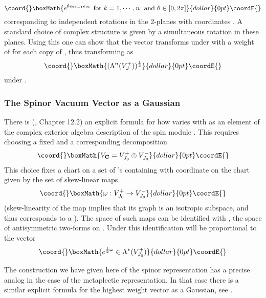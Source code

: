 \documentclass[a4paper,a4paper]{article}
\theoremstyle{conjecture}
\begin{document}
$$\coord{}\boxMath{ e^{\theta e_{2k-1}e_{2k}} \ \text{for} \ k=1,\cdots,n\ \ \text{and} \ \theta\in [0,2\pi]}{dollar}{0pt}\coordE{}$$
corresponding to independent rotations in the \coordHE{} 2-planes with coordinates \coordHE{}.
A standard choice of complex structure \coordHE{} is given by a simultaneous \coordHE{} rotation
in these planes. Using this one can show that the vector \coordHE{} transforms under \coordHE{}
with a weight of \coordHE{} for each copy of \coordHE{}, thus transforming as
$$\coord{}\boxMath{(\Lambda^{n}(V^+_J))^{\frac{1}{2}}}{dollar}{0pt}\coordE{}$$
under \coordHE{}.

\subsubsection{The Spinor Vacuum Vector as a Gaussian}
\label{spinor-vacuum-vector}

There is (\cite{PS}, Chapter 12.2) an explicit formula for how \coordHE{} 
varies with \coordHE{} as an element of the complex exterior algebra description of 
the spin module \coordHE{}. 
This requires choosing a fixed \coordHE{} and a corresponding 
decomposition 
$$\coord{}\boxMath{V_{\mathbf C}=V^+_{J_0}\oplus V^-_{J_0}}{dollar}{0pt}\coordE{}$$
This choice fixes a chart on a set of \coordHE{}'s containing \coordHE{} with coordinate
on the chart given by the set of skew-linear maps
$$\coord{}\boxMath{\omega: V^+_{J_0}\rightarrow V^-_{J_0}}{dollar}{0pt}\coordE{}$$
(skew-linearity of the map implies that its graph is an isotropic subspace,
and thus corresponds to a \coordHE{}). The space of such maps can be identified with
\coordHE{}, the space of antisymmetric two-forms on \coordHE{}. Under
this identification \coordHE{} will be proportional to the vector
$$\coord{}\boxMath{e^{\frac{1}{2}\omega}\in \Lambda^*(V^+_{J_0})}{dollar}{0pt}\coordE{}$$

The construction we have given here of the spinor representation has a precise
analog in the case of the metaplectic representation. In that case there is
a similar explicit formula for the highest weight vector as a Gaussian, see
\cite{Segal2}. 
\end{document}
